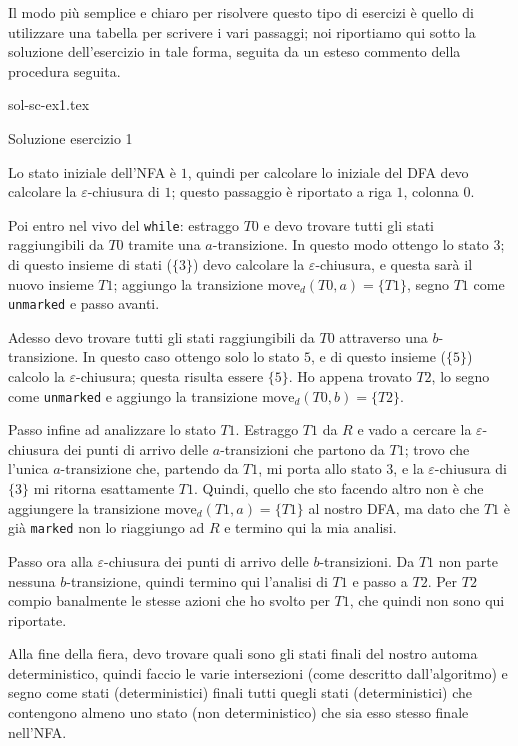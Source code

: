 \documentclass[class=book, crop=false, oneside, 12pt]{standalone}
\begin{document}
Il modo più semplice e chiaro per risolvere questo tipo di esercizi è quello di utilizzare una tabella per scrivere i vari passaggi; noi riportiamo qui sotto la soluzione dell'esercizio in tale forma, seguita da un esteso commento della procedura seguita.
\begin{table}[H]
	\centering
	{sol-sc-ex1.tex}
    \caption{Soluzione esercizio 1}
    \label{sol-sc-ex1}
\end{table} 
Lo stato iniziale dell'NFA è \(1\), quindi per calcolare lo iniziale del DFA devo calcolare la \(\varepsilon\)-chiusura di \(1\); questo passaggio è riportato a riga \(1\), colonna \(0\).

Poi entro nel vivo del \texttt{while}: estraggo \(T0\) e devo trovare tutti gli stati raggiungibili da \(T0\) tramite una \(a\)-transizione. In questo modo ottengo lo stato \(3\); di questo insieme di stati (\(\{3\}\)) devo calcolare la \(\varepsilon\)-chiusura, e questa sarà il nuovo insieme \(T1\); aggiungo la transizione \(\textrm{move}_d(T0, a)=\{T1\}\), segno \(T1\) come \texttt{unmarked} e passo avanti.

Adesso devo trovare tutti gli stati raggiungibili da \(T0\) attraverso una \(b\)-transizione. In questo caso ottengo solo lo stato \(5\), e di questo insieme (\(\{5\}\)) calcolo la \(\varepsilon\)-chiusura; questa risulta essere \(\{5\}\). Ho appena trovato \(T2\), lo segno come \texttt{unmarked} e aggiungo la transizione \(\textrm{move}_d(T0, b)=\{T2\}\).

Passo infine ad analizzare lo stato \(T1\). Estraggo \(T1\) da \(R\) e vado a cercare la \(\varepsilon\)-chiusura dei punti di arrivo delle \(a\)-transizioni che partono da \(T1\); trovo che l'unica \(a\)-transizione che, partendo da \(T1\), mi porta allo stato \(3\), e la \(\varepsilon\)-chiusura di \(\{3\}\) mi ritorna esattamente \(T1\). Quindi, quello che sto facendo altro non è che aggiungere la transizione \(\textrm{move}_d(T1, a)=\{T1\}\) al nostro DFA, ma dato che \(T1\) è già \texttt{marked} non lo riaggiungo ad \(R\) e termino qui la mia analisi.

Passo ora alla \(\varepsilon\)-chiusura dei punti di arrivo delle \(b\)-transizioni. Da \(T1\) non parte nessuna \(b\)-transizione, quindi termino qui l'analisi di \(T1\) e passo a \(T2\).
Per \(T2\) compio banalmente le stesse azioni che ho svolto per \(T1\), che quindi non sono qui riportate.

Alla fine della fiera, devo trovare quali sono gli stati finali del nostro automa deterministico, quindi faccio le varie intersezioni (come descritto dall'algoritmo) e segno come stati (deterministici) finali tutti quegli stati (deterministici) che contengono almeno uno stato (non deterministico) che sia esso stesso finale nell'NFA.
\end{document}
